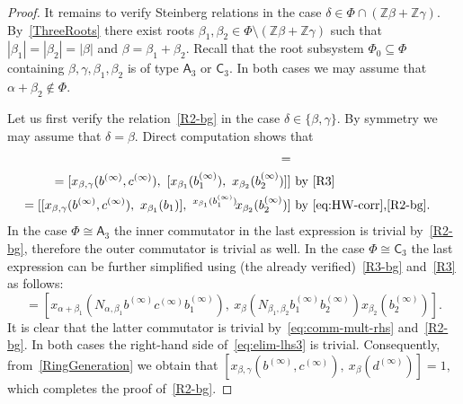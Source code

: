\documentclass{article}
\numberwithin{equation}{section}
\theoremstyle{definition}
\theoremstyle{remark}
\newcommand{\ZZ}{\mathbb{Z}}
\newcommand{\up}[2]{{^{#1}\!{#2}}}
\newcommand{\rA}{\mathsf{A}}
\newcommand{\rC}{\mathsf{C}}
\begin{document}
\begin{proof}
 It remains to verify Steinberg relations in the case \(\delta \in \Phi \cap (\ZZ \beta + \ZZ \gamma)\).
 By~\cref{ThreeRoots} there exist roots \(\beta_1, \beta_2 \in \Phi \setminus (\ZZ \beta + \ZZ \gamma)\) such that \(|\beta_1| = |\beta_2| = |\beta|\) and \(\beta = \beta_1 + \beta_2\). 
 Recall that the root subsystem $\Phi_0 \subseteq \Phi$ containing $\beta,\gamma,\beta_1,\beta_2$ is of type $\rA_3$ or $\rC_3$. 
 In both cases we may assume that $\alpha + \beta_2 \not\in\Phi$.
 
 Let us first verify the relation~\eqref{R2-bg} in the case $\delta \in \{\beta, \gamma\}$. By symmetry we may assume that $\delta = \beta$. 
 Direct computation shows that
 \begin{align}
  [x_{\beta,\gamma}(b^{(\infty)}, c^{(\infty)}),\ x_\beta(N_{\beta_1, \beta_2} b_1^{(\infty)}b_2^{(\infty)})] = \label{eq:elim-lhs3} \\
   = [x_{\beta,\gamma}(b^{(\infty)}, c^{(\infty)}),\ [x_{\beta_1}(b_1^{(\infty)}),\ x_{\beta_2}(b_2^{(\infty)})]]  & \text{ by~\eqref{R3}} \nonumber \\ 
   = [[x_{\beta, \gamma}(b^{(\infty)}, c^{(\infty)}),\ x_{\beta_1}(b_1)],\ \up{x_{\beta_1}(b_1^{(\infty)})} x_{\beta_2}(b_2^{(\infty)})]  & \text{ by~\eqref{eq:HW-corr},\eqref{R2-bg}.} \nonumber \end{align}
In the case $\Phi\cong \rA_3$ the inner commutator in the last expression is trivial by~\eqref{R2-bg},
 therefore the outer commutator is trivial as well.
In the case $\Phi\cong \rC_3$ the last expression can be further simplified using (the already verified)~\eqref{R3-bg} and~\eqref{R3} as follows:
\[ = [x_{\alpha+\beta_1}(N_{\alpha, \beta_1} b^{(\infty)}c^{(\infty)}b_1^{(\infty)}),\ x_{\beta}(N_{\beta_1, \beta_2} b_1^{(\infty)} b_2^{(\infty)}) x_{\beta_2}(b_2^{(\infty)})]. \]
It is clear that the latter commutator is trivial by~\eqref{eq:comm-mult-rhs} and~\eqref{R2-bg}.  
  In both cases the right-hand side of~\eqref{eq:elim-lhs3} is trivial. Consequently, from~\cref{RingGeneration} we obtain that
 $[x_{\beta,\gamma}(b^{(\infty)}, c^{(\infty)}),\ x_\beta(d^{(\infty)})] = 1,$
 which completes the proof of~\eqref{R2-bg}. 
 

\end{proof}
\end{document}
